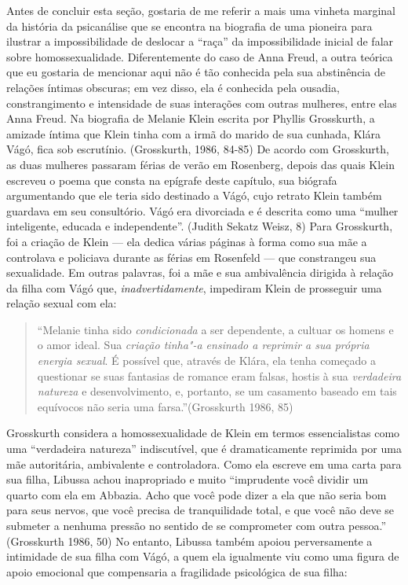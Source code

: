 Antes de concluir esta seção, gostaria de me referir a mais uma vinheta
marginal da história da psicanálise que se encontra na biografia de uma
pioneira para ilustrar a impossibilidade de deslocar a ``raça'' da
impossibilidade inicial de falar sobre homossexualidade. Diferentemente
do caso de Anna Freud, a outra teórica que eu gostaria de mencionar aqui
não é tão conhecida pela sua abstinência de relações íntimas obscuras;
em vez disso, ela é conhecida pela ousadia, constrangimento e
intensidade de suas interações com outras mulheres, entre elas Anna
Freud. Na biografia de Melanie Klein escrita por Phyllis Grosskurth, a
amizade íntima que Klein tinha com a irmã do marido de sua cunhada,
Klára Vágó, fica sob escrutínio. (Grosskurth, 1986, 84-85) De acordo com
Grosskurth, as duas mulheres passaram férias de verão em Rosenberg,
depois das quais Klein escreveu o poema que consta na epígrafe deste
capítulo, sua biógrafa argumentando que ele teria sido destinado a Vágó,
cujo retrato Klein também guardava em seu consultório. Vágó era
divorciada e é descrita como uma ``mulher inteligente, educada e
independente''. (Judith Sekatz Weisz, 8) Para Grosskurth, foi a criação
de Klein --- ela dedica várias páginas à forma como sua mãe a controlava
e policiava durante as férias em Rosenfeld --- que constrangeu sua
sexualidade. Em outras palavras, foi a mãe e sua ambivalência dirigida à
relação da filha com Vágó que, \emph{inadvertidamente}, impediram Klein
de prosseguir uma relação sexual com ela:

\begin{quote}
``Melanie tinha sido \emph{condicionada} a ser dependente, a cultuar os
homens e o amor ideal. Sua \emph{criação tinha"-a ensinado a reprimir a
sua própria energia sexual}. É possível que, através de Klára, ela tenha
começado a questionar se suas fantasias de romance eram falsas, hostis à
sua \emph{verdadeira natureza} e desenvolvimento, e, portanto, se um
casamento baseado em tais equívocos não seria uma farsa.''(Grosskurth
1986, 85)
\end{quote}

Grosskurth considera a homossexualidade de Klein em termos
essencialistas como uma ``verdadeira natureza'' indiscutível, que é
dramaticamente reprimida por uma mãe autoritária, ambivalente e
controladora. Como ela escreve em uma carta para sua filha, Libussa
achou inapropriado e muito ``imprudente você dividir um quarto com ela
em Abbazia. Acho que você pode dizer a ela que não seria bom para seus
nervos, que você precisa de tranquilidade total, e que você não deve se
submeter a nenhuma pressão no sentido de se comprometer com outra
pessoa.'' (Grosskurth 1986, 50) No entanto, Libussa também apoiou
perversamente a intimidade de sua filha com Vágó, a quem ela igualmente
viu como uma figura de apoio emocional que compensaria a fragilidade
psicológica de sua filha:

